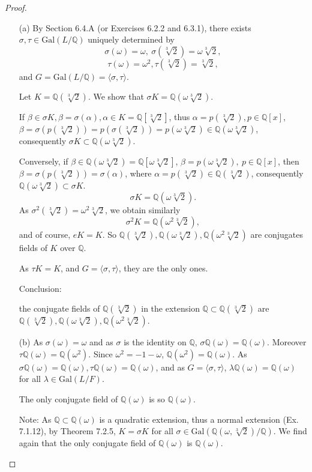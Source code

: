 \documentclass[11pt,a4paper]{article}
\newcommand{\Q}{\mathbb{Q}}
\newcommand{\Gal}{\mathrm{Gal}}
\begin{document}
\begin{proof}
\begin{enumerate}
\item[(a)]
By Section 6.4.A (or Exercises 6.2.2 and 6.3.1), there exists $\sigma,\tau \in \Gal(L/\Q)$ uniquely determined by
 $$\sigma(\omega) = \omega, \ \sigma(\sqrt[3]{2}) = \omega \sqrt[3]{2},$$
 $$\tau(\omega) = \omega^2, \tau(\sqrt[3]{2}) =  \sqrt[3]{2},$$
 and $G = \Gal(L/\Q) = \langle \sigma, \tau\rangle$.
 
 
Let  $K = \Q(\sqrt[3]{2})$. We show that $\sigma K = \Q(\omega \sqrt[3]{2})$.

If $\beta \in \sigma K, \beta = \sigma (\alpha), \alpha \in K = \Q[\sqrt[3]{2}]$, thus $\alpha =p(\sqrt[3]{2}), p \in \Q[x]$,  $\beta = \sigma(p(\sqrt[3]{2})) = p(\sigma(\sqrt[3]{2})) =p(\omega \sqrt[3]{2}) \in \Q(\omega \sqrt[3]{2})$, consequently $\sigma K \subset \Q(\omega \sqrt[3]{2})$.

Conversely, if $\beta \in \Q(\omega \sqrt[3]{2}) =\Q[\omega \sqrt[3]{2}]$, $\beta = p(\omega \sqrt[3]{2}),\ p \in \Q[x]$, then $\beta = \sigma(p(\sqrt[3]{2})) =\sigma(\alpha)$, where $\alpha = p(\sqrt[3]{2}) \in \Q(\sqrt[3]{2})$, consequently $  \Q(\omega \sqrt[3]{2})\subset \sigma K$.
$$\sigma K = \Q(\omega \sqrt[3]{2}).$$
As $\sigma^2( \sqrt[3]{2}) = \omega^2  \sqrt[3]{2}$, we obtain similarly
$$\sigma^2 K = \Q(\omega^2 \sqrt[3]{2}),$$
and of course, $eK = K$. So $\Q(\sqrt[3]{2}),  \Q(\omega \sqrt[3]{2}),\Q(\omega^2 \sqrt[3]{2})$ are conjugates fields of $K$ over $\Q$.

As $\tau K = K$, and $G = \langle \sigma, \tau\rangle$, they are the only ones.

Conclusion: 

the conjugate fields of $\Q(\sqrt[3]{2})$ in the extension $\Q \subset \Q(\sqrt[3]{2})$ are $\Q(\sqrt[3]{2}),  \Q(\omega \sqrt[3]{2}),\Q(\omega^2 \sqrt[3]{2})$.

\item[(b)]
As $\sigma(\omega) = \omega$ and as $\sigma$ is the identity on $\Q$, $\sigma \Q(\omega) = \Q(\omega)$. Moreover $\tau \Q(\omega) = \Q(\omega^2)$. Since $\omega^2 = -1 - \omega$, $\Q(\omega^2) = \Q(\omega)$.
As $\sigma \Q(\omega) = \Q(\omega),\tau  \Q(\omega) = \Q(\omega)$, and as $G =  \langle \sigma, \tau\rangle$,  $\lambda \Q(\omega)  = \Q(\omega) $ for all $\lambda \in \Gal(L/F)$.

The only conjugate field of $\Q(\omega)$ is so $\Q(\omega)$.

Note: As $\Q \subset \Q(\omega)$ is a quadratic extension,  thus a normal extension (Ex. 7.1.12), by Theorem 7.2.5, $K = \sigma K$ for all $\sigma \in \Gal(\Q(\omega, \sqrt[3]{2})/\Q)$. We find again that the only conjugate field of $\Q(\omega)$ is $\Q(\omega)$.

\end{enumerate}
\end{proof}
\end{document}
